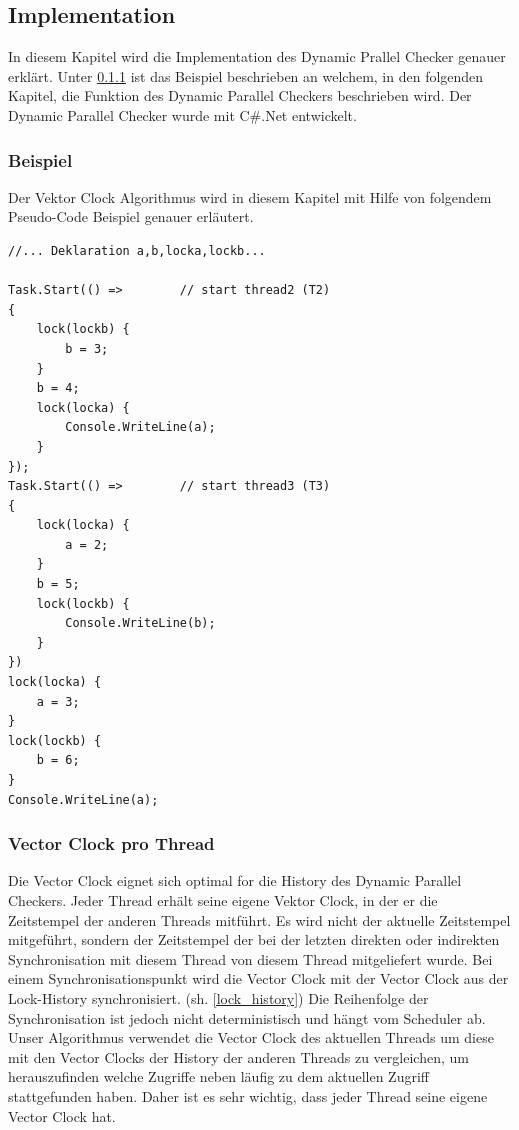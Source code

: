\documentclass[10pt,a4paper]{article}
\begin{document}
\subsection{Implementation}\label{implementation}
In diesem Kapitel wird die Implementation des Dynamic Prallel Checker genauer erklärt. Unter \ref{example} ist das Beispiel beschrieben an welchem, in den folgenden Kapitel, die Funktion des Dynamic Parallel Checkers beschrieben wird. Der Dynamic Parallel Checker wurde mit C\#.Net entwickelt.
\subsubsection{Beispiel}\label{example}
\begin{flushleft}
Der Vektor Clock Algorithmus wird in diesem Kapitel mit Hilfe von folgendem Pseudo-Code Beispiel genauer erläutert.\\
\begin{singlespace}
\begin{lstlisting}
//... Deklaration a,b,locka,lockb...

Task.Start(() =>		// start thread2 (T2)
{
	lock(lockb) {
		b = 3;
	}
	b = 4;
	lock(locka) {
		Console.WriteLine(a);
	}
});
Task.Start(() =>		// start thread3 (T3)
{
	lock(locka) {
		a = 2;
	}
	b = 5;
	lock(lockb) {
		Console.WriteLine(b);
	}
})
lock(locka) {
	a = 3;
}
lock(lockb) {
	b = 6;
}
Console.WriteLine(a);
\end{lstlisting}
\end{singlespace}
\end{flushleft}
\subsubsection{Vector Clock pro Thread}
\begin{flushleft}
Die Vector Clock eignet sich optimal for die History des Dynamic Parallel Checkers. Jeder Thread erhält seine eigene Vektor Clock, in der er die Zeitstempel der anderen Threads mitführt. Es wird nicht der aktuelle Zeitstempel mitgeführt, sondern der Zeitstempel der bei der letzten direkten oder indirekten Synchronisation mit diesem Thread von diesem Thread mitgeliefert wurde. Bei einem Synchronisationspunkt wird die Vector Clock mit der Vector Clock aus der Lock-History synchronisiert. (sh. \ref{lock_history}) Die Reihenfolge der Synchronisation ist jedoch nicht deterministisch und hängt vom Scheduler ab.\\
Unser Algorithmus verwendet die Vector Clock des aktuellen Threads um diese mit den Vector Clocks der History der anderen Threads zu vergleichen, um herauszufinden welche Zugriffe neben läufig zu dem aktuellen Zugriff stattgefunden haben. Daher ist es sehr wichtig, dass jeder Thread seine eigene Vector Clock hat.
\end{flushleft}
\end{document}
